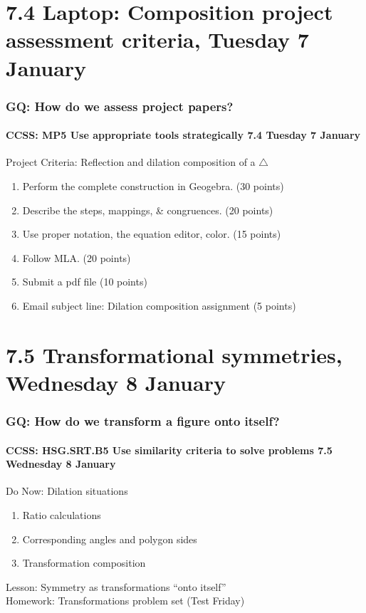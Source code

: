 \documentclass{beamer}
\begin{document}
\section{7.4 Laptop: Composition project assessment criteria, Tuesday 7 January}
\frame
{
  \frametitle{GQ: How do we assess project papers?}
  \framesubtitle{CCSS: MP5 Use appropriate tools strategically \hfill \alert{7.4 Tuesday 7 January}}

  \begin{block}{Project Criteria: Reflection and dilation composition of a $\triangle$}
  \begin{enumerate}
    \item Perform the complete construction in Geogebra. \hfill (30 points)
    \item Describe the steps, mappings, \& congruences.  \hfill (20 points)
    \item Use proper notation, the equation editor, color.  \hfill (15 points)
    \item Follow MLA. \hfill (20 points)
    \item Submit a pdf file \hfill (10 points)
    \item Email subject line: Dilation composition assignment \hfill (5 points)
  \end{enumerate}
  \end{block}
}

\section{7.5 Transformational symmetries, Wednesday 8 January}
\frame
{
  \frametitle{GQ: How do we transform a figure onto itself?}
  \framesubtitle{CCSS: HSG.SRT.B5 Use similarity criteria to solve problems \hfill \alert{7.5 Wednesday 8 January}}

  \begin{block}{Do Now: Dilation situations}
  \begin{enumerate}
    \item Ratio calculations
    \item Corresponding angles and polygon sides
    \item Transformation composition
  \end{enumerate}
  \end{block}
  Lesson: Symmetry as transformations ``onto itself'' \\[0.5cm]
  Homework: Transformations problem set (\alert{Test Friday})
}
\end{document}
